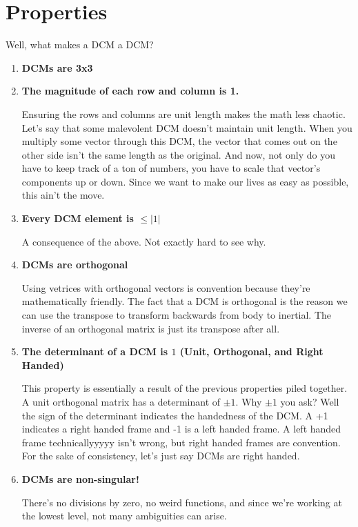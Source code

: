 \documentclass[a4paper,14pt]{extreport}
\begin{document}
\section{Properties}
Well, what makes a DCM a DCM?
\begin{enumerate}
\item{\textbf{DCMs are 3x3}}

\item{\textbf{The magnitude of each row and column is 1.}}

Ensuring the rows and columns are unit length makes the math less chaotic. Let's say that some malevolent DCM doesn't maintain unit length. When you multiply some vector through this DCM, the vector that comes out on the other side isn't the same length as the original. And now, not only do you have to keep track of a ton of numbers, you have to scale that vector's components up or down. Since we want to make our lives as easy as possible, this ain't the move.

\item{\textbf{Every DCM element is $\leq |1|$}}

A consequence of the above. Not exactly hard to see why.

\item{\textbf{DCMs are orthogonal}}

Using vetrices with orthogonal vectors is convention because they're mathematically friendly. The fact that a DCM is orthogonal is the reason we can use the transpose to transform backwards from body to inertial. The inverse of an orthogonal matrix is just its transpose after all.

\item{\textbf{The determinant of a DCM is $1$ (Unit, Orthogonal, and Right Handed)}}

This property is essentially a result of the previous properties piled together. A unit orthogonal matrix has a determinant of $\pm 1$. Why $\pm 1$ you ask? Well the sign of the determinant indicates the handedness of the DCM. A +1 indicates a right handed frame and -1 is a left handed frame. A left handed frame technicallyyyyy isn't wrong, but right handed frames are convention. For the sake of consistency, let's just say DCMs are right handed.

\item{\textbf{DCMs are non-singular!}}

There's no divisions by zero, no weird functions, and since we're working at the lowest level, not many ambiguities can arise.
\end{enumerate}
\end{document}

